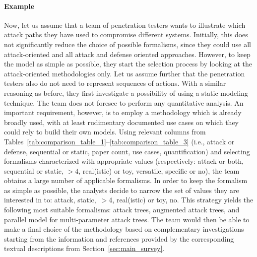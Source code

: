 \documentclass[a4paper]{article}
\begin{document}
\paragraph{Example \theexmpl}

Now, let us assume that a team of penetration testers wants to illustrate which
attack paths they have used to compromise different systems. Initially, this
does not significantly reduce the choice of possible formalisms, since they
could use all attack-oriented and all attack and defense oriented approaches.
However, to  keep the model as simple as possible, they start the selection
process by  looking at the attack-oriented methodologies only. Let us assume
further that the penetration testers also do not need to represent sequences of
actions.  With a similar reasoning as before, they first investigate a
possibility of using a static modeling technique. The team does not foresee to
perform any quantitative analysis. An important requirement, however, is to
employ a methodology which is already broadly used, with at least rudimentary
documented use cases on which they could rely to build their own models. Using
relevant columns from
Tables~\ref{tab:comparison_table_1}--\ref{tab:comparison_table_3}  (i.e., attack
or defense, sequential or static, paper count, use cases,  quantification) and
selecting formalisms characterized with appropriate values (respectively:  
attack or both, sequential or static, $>4$, real(istic) or toy, versatile,
specific or no), the team obtains a  large number of applicable formalisms. In
order to keep the formalism as simple  as possible, the analysts decide to
narrow the set of values they are  interested in to: attack, static,~$>4$,
real(istic) or toy, no. This strategy  yields the following most suitable
formalisms: attack trees, augmented attack  trees, and parallel model for
multi-parameter attack trees. The team would then be able to make a final choice
of the methodology based on complementary investigations starting from the
information and references provided by the corresponding textual descriptions
from Section~\ref{sec:main_survey}.
\end{document}
